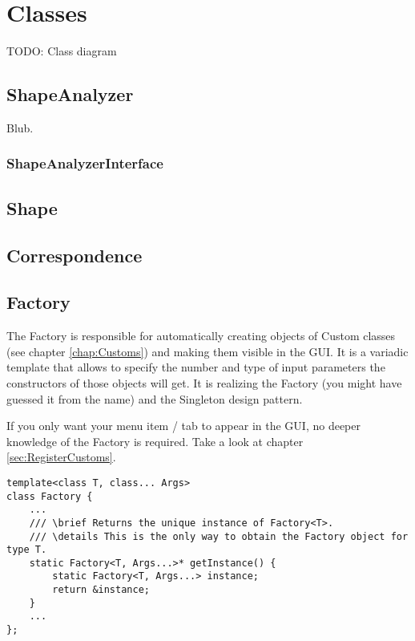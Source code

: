 
\chapter{Classes}

TODO: Class diagram

\section{ShapeAnalyzer}
\label{sec:ShapeAnalyzer}

Blub.

\subsection{ShapeAnalyzerInterface}
\label{subsec:ShapeAnalyzerInterface}

\section{Shape}
\label{sec:Shape}

\section{Correspondence}
\label{sec:Correspondence}

\section{Factory}
\label{sec:Factory}

The Factory is responsible for automatically creating objects of Custom classes (see chapter \ref{chap:Customs}) and making them visible in the GUI. It is a variadic template that allows to specify the number and type of input parameters the constructors of those objects will get. It is realizing the Factory (you might have guessed it from the name) and the Singleton design pattern. 

\begin{mdframed}
If you only want your menu item / tab to appear in the GUI, no deeper knowledge of the Factory is required. Take a look at chapter \ref{sec:RegisterCustoms}. 
\end{mdframed}

\begin{lstlisting}[style=lstStyleCpp, caption={Factory.h}]
template<class T, class... Args>
class Factory {
    ...
    /// \brief Returns the unique instance of Factory<T>.
    /// \details This is the only way to obtain the Factory object for type T.
    static Factory<T, Args...>* getInstance() {
        static Factory<T, Args...> instance;
        return &instance;
    }
    ...
};
\end{lstlisting}

